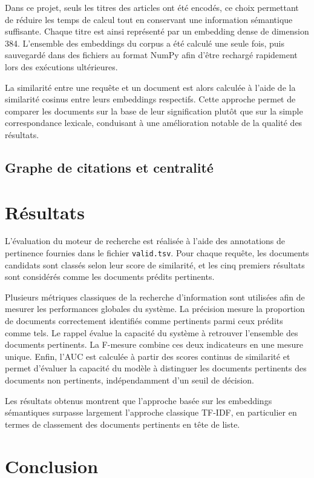 \documentclass{rapportECL}
\begin{document}
Dans ce projet, seuls les titres des articles ont été encodés, ce choix permettant de réduire les temps de calcul tout en conservant une information sémantique suffisante. Chaque titre est ainsi représenté par un embedding dense de dimension 384. L’ensemble des embeddings du corpus a été calculé une seule fois, puis sauvegardé dans des fichiers au format NumPy afin d’être rechargé rapidement lors des exécutions ultérieures.

La similarité entre une requête et un document est alors calculée à l’aide de la similarité cosinus entre leurs embeddings respectifs. Cette approche permet de comparer les documents sur la base de leur signification plutôt que sur la simple correspondance lexicale, conduisant à une amélioration notable de la qualité des résultats.

\subsection{Graphe de citations et centralité}





\section{Résultats}

L’évaluation du moteur de recherche est réalisée à l’aide des annotations de pertinence fournies dans le fichier \texttt{valid.tsv}. Pour chaque requête, les documents candidats sont classés selon leur score de similarité, et les cinq premiers résultats sont considérés comme les documents prédits pertinents.

Plusieurs métriques classiques de la recherche d’information sont utilisées afin de mesurer les performances globales du système. La précision mesure la proportion de documents correctement identifiés comme pertinents parmi ceux prédits comme tels. Le rappel évalue la capacité du système à retrouver l’ensemble des documents pertinents. La F-mesure combine ces deux indicateurs en une mesure unique. Enfin, l’AUC est calculée à partir des scores continus de similarité et permet d’évaluer la capacité du modèle à distinguer les documents pertinents des documents non pertinents, indépendamment d’un seuil de décision.

Les résultats obtenus montrent que l’approche basée sur les embeddings sémantiques surpasse largement l’approche classique TF-IDF, en particulier en termes de classement des documents pertinents en tête de liste.

\section{Conclusion}
\end{document}
